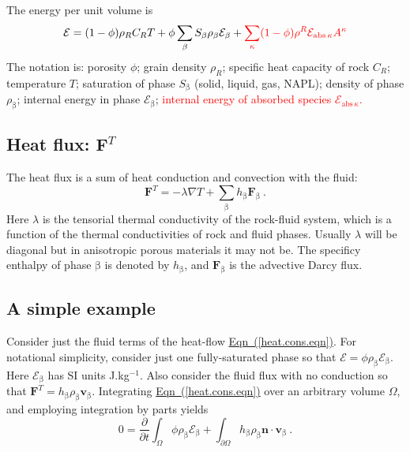 \documentclass[12pt]{report}
\def\species{\kappa}
\def\phase{\mathrm{\beta}}
\def\flux{\mathbf{F}}
\def\darcyvel{\mathbf{v}}
\def\energydens{\mathcal{E}}
\begin{document}
The energy per unit volume is
\begin{equation}
\energydens = (1-\phi)\rho_{R}C_{R}T +
\phi\sum_{\phase}S_{\phase}\rho_{\phase}\energydens_{\phase} +
\textcolor{red}{\sum_{\species}(1 -
  \phi)\rho^{R}\energydens_{\mathrm{abs\,}\species}A^{\species}}
\label{en.per.vol.eqn}
\end{equation}
The notation is: porosity $\phi$; grain density $\rho_{R}$; specific
heat capacity of rock $C_{R}$; temperature $T$; saturation of phase
$S_{\phase}$ (solid, liquid, gas, NAPL); density of phase $\rho_{\phase}$;
internal energy in phase $\energydens_{\phase}$; \textcolor{red}{internal energy of
absorbed species $\energydens_{\mathrm{abs\,}\species}$.}


\subsection{Heat flux: $\flux^{T}$}

The heat flux is a sum of heat conduction and convection with the
fluid:
\begin{equation}
\flux^{T} = -\lambda \nabla T + \sum_{\phase}h_{\phase}\flux_{\phase}
\ .
\label{heat.flux.eqn}
\end{equation}
Here $\lambda$ is the tensorial thermal conductivity of the rock-fluid
system, which is a function of the thermal conductivities of
rock and fluid phases.  Usually $\lambda$ will be diagonal but in
anisotropic porous materials it may not be.
The specificy enthalpy of phase $\phase$ is denoted by $h_{\phase}$, and
$\flux_{\phase}$ is the advective Darcy flux.

\subsection{A simple example}

Consider just the fluid terms of the heat-flow
\hyperref[heat.cons.eqn]{Eqn~(\ref{heat.cons.eqn})}.  For notational
simplicity, consider just one fully-saturated phase so that
$\energydens = \phi\rho_{\phase}\energydens_{\phase}$.  Here
$\energydens_{\phase}$ has SI units J.kg$^{-1}$.  Also consider the
fluid flux with no conduction so that $\flux^{T} =
h_{\phase}\rho_{\phase}\darcyvel_{\phase}$.  Integrating
\hyperref[heat.cons.eqn]{Eqn~(\ref*{heat.cons.eqn})} over an arbitrary
volume $\Omega$, and employing integration by parts yields
\begin{equation}
0 = \frac{\partial}{\partial t}\int_{\Omega}
\phi\rho_{\phase}\energydens_{\phase} +
\int_{\partial\Omega}h_{\phase}\rho_{\phase}\mathbf{n}\cdot\darcyvel_{\phase}
\ .
\end{equation}
\end{document}
